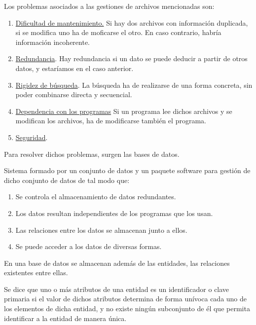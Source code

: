Los problemas asociados a las gestiones de archivos mencionadas son:
\begin{enumerate}
    \item \underline{Dificultad de mantenimiento.} Si hay dos archivos con información duplicada, si se modifica uno ha de moficarse el otro. En caso contrario, habría información incoherente.
    \item \underline{Redundancia}. Hay redundancia si un dato se puede deducir a partir de otros datos, y estaríamos en el caso anterior.
    \item \underline{Rigidez de búsqueda}. La búsqueda ha de realizarse de una forma concreta, sin poder combinarse directa y secuencial.
    \item \underline{Dependencia con los programas} Si un programa lee dichos archivos y se modifican los archivos, ha de modificarse también el programa.
    \item \underline{Seguridad}.
\end{enumerate}

Para resolver dichos problemas, surgen las bases de datos.
\begin{definicion}
    Sistema formado por un conjunto de datos y un paquete software para gestión de dicho conjunto de datos de tal modo que:
    \begin{enumerate}
        \item Se controla el almacenamiento de datos redundantes.
        \item Los datos resultan independientes de los programas que los usan.
        \item Las relaciones entre los datos se almacenan junto a ellos.
        \item Se puede acceder a los datos de diversas formas.
    \end{enumerate}

    En una base de datos se almacenan además de las entidades, las relaciones existentes entre ellas.
\end{definicion}

\begin{definicion}
    Se dice que uno o más atributos de una entidad es un identificador o clave primaria si el valor de dichos atributos determina de forma unívoca cada uno de los elementos de dicha entidad, y no existe ningún subconjunto de él que permita identificar a la entidad de manera única.
\end{definicion}